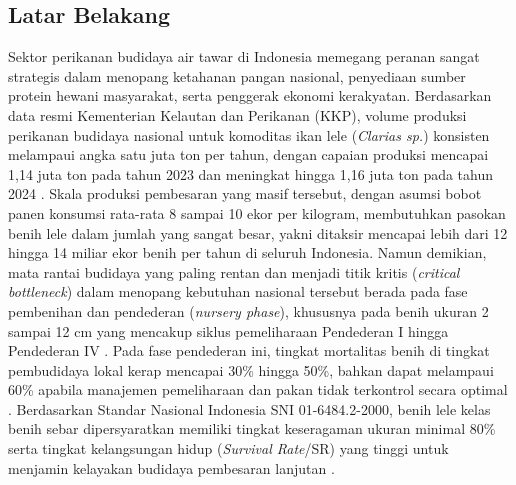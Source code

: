 \subsection{Latar Belakang}
Sektor perikanan budidaya air tawar di Indonesia memegang peranan sangat strategis dalam menopang ketahanan pangan nasional, penyediaan sumber protein hewani masyarakat, serta penggerak ekonomi kerakyatan. Berdasarkan data resmi Kementerian Kelautan dan Perikanan (KKP), volume produksi perikanan budidaya nasional untuk komoditas ikan lele (\textit{Clarias sp.}) konsisten melampaui angka satu juta ton per tahun, dengan capaian produksi mencapai 1,14 juta ton pada tahun 2023 dan meningkat hingga 1,16 juta ton pada tahun 2024 \cite{KKP2023}. Skala produksi pembesaran yang masif tersebut, dengan asumsi bobot panen konsumsi rata-rata 8 sampai 10 ekor per kilogram, membutuhkan pasokan benih lele dalam jumlah yang sangat besar, yakni ditaksir mencapai lebih dari 12 hingga 14 miliar ekor benih per tahun di seluruh Indonesia. Namun demikian, mata rantai budidaya yang paling rentan dan menjadi titik kritis (\textit{critical bottleneck}) dalam menopang kebutuhan nasional tersebut berada pada fase pembenihan dan pendederan (\textit{nursery phase}), khususnya pada benih ukuran 2 sampai 12 cm yang mencakup siklus pemeliharaan Pendederan I hingga Pendederan IV \cite{kurdowi2025technique}. Pada fase pendederan ini, tingkat mortalitas benih di tingkat pembudidaya lokal kerap mencapai 30\% hingga 50\%, bahkan dapat melampaui 60\% apabila manajemen pemeliharaan dan pakan tidak terkontrol secara optimal \cite{gisbert2021development,pelu2025pengaruh}. Berdasarkan Standar Nasional Indonesia SNI 01-6484.2-2000, benih lele kelas benih sebar dipersyaratkan memiliki tingkat keseragaman ukuran minimal 80\% serta tingkat kelangsungan hidup (\textit{Survival Rate}/SR) yang tinggi untuk menjamin kelayakan budidaya pembesaran lanjutan \cite{BSN2000}.

